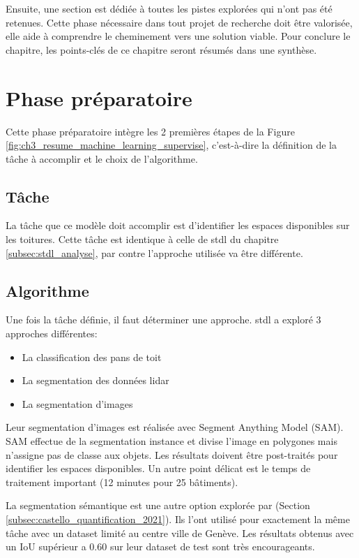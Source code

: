Ensuite, une section est dédiée à toutes les pistes explorées qui n'ont pas été retenues. Cette phase nécessaire dans tout projet de recherche doit être valorisée, elle aide à comprendre le cheminement vers une solution viable. Pour conclure le chapitre, les points-clés de ce chapitre seront résumés dans une synthèse.



\section{Phase préparatoire}
Cette phase préparatoire intègre les 2 premières étapes de la Figure \ref{fig:ch3_resume_machine_learning_supervise}, c'est-à-dire la définition de la tâche à accomplir et le choix de l'algorithme.

\subsection{Tâche}
La tâche que ce modèle doit accomplir est d'identifier les espaces disponibles sur les toitures. Cette tâche est identique à celle de \acrshort{stdl} du chapitre \ref{subsec:stdl_analyse}, par contre l'approche utilisée va être différente.

\subsection{Algorithme}
Une fois la tâche définie, il faut déterminer une approche. \acrshort{stdl} a exploré 3 approches différentes:
\begin{itemize}
    \item La classification des pans de toit
    \item La segmentation des données \gls{lidar}
    \item La segmentation d'images
\end{itemize}

Leur segmentation d'images est réalisée avec Segment Anything Model (SAM). SAM effectue de la segmentation instance et divise l'image en polygones mais n'assigne pas de classe aux objets. Les résultats doivent être post-traités pour identifier les espaces disponibles. Un autre point délicat est le temps de traitement important (12 minutes pour 25 bâtiments).

La segmentation sémantique est une autre option explorée par \citeauthor{castello_quantification_2021} (Section \ref{subsec:castello_quantification_2021}). Ils l'ont utilisé pour exactement la même tâche avec un dataset limité au centre ville de Genève. Les résultats obtenus avec un IoU supérieur a 0.60 sur leur dataset de test sont très encourageants.

